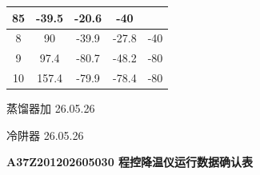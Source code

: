 \documentclass[UTF8,10pt,a4paper,fontset=fandol]{ctexart}
\newcommand{\fieldvalue}[1]{#1}
\newcommand{\handwritten}[1]{#1}
\begin{document}
\begin{center}
\begin{tabular}{|c|c|c|c|c|}
\fieldvalue{85} &
\fieldvalue{-39.5} &
\fieldvalue{-20.6} &
\fieldvalue{-40}\\
\hline
8 &
\fieldvalue{90} &
\fieldvalue{-39.9} &
\fieldvalue{-27.8} &
\fieldvalue{-40}\\
\hline
9 &
\fieldvalue{97.4} &
\fieldvalue{-80.7} &
\fieldvalue{-48.2} &
\fieldvalue{-80}\\
\hline
10 &
\fieldvalue{157.4} &
\fieldvalue{-79.9} &
\fieldvalue{-78.4} &
\fieldvalue{-80}\\
\hline
\end{tabular}
\end{center}

\normalsize

\handwritten{蒸馏器加 26.05.26}

\handwritten{冷阱器 26.05.26}

\newpage

\noindent\textbf{A37Z201202605030 程控降温仪运行数据确认表}
\end{document}
